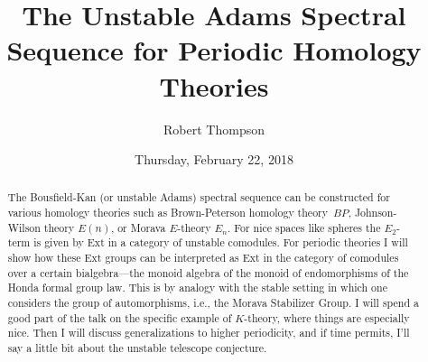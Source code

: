 \documentclass{UAmathtalk}
\author{Robert Thompson}
\title{The Unstable Adams Spectral Sequence for Periodic Homology Theories}
\date{Thursday, February 22, 2018}
\begin{document}
\maketitle

\begin{abstract}
The Bousfield-Kan (or unstable Adams) spectral sequence can be constructed for various homology theories such as Brown-Peterson homology theory~$\mathit{BP}$, Johnson-Wilson theory $E(n)$, or Morava $E$-theory $E_n$. For nice spaces like spheres the $E_2$-term is given by $\mathrm{Ext}$ in a category of unstable comodules. For periodic theories I will show how these $\mathrm{Ext}$ groups can be interpreted as $\mathrm{Ext}$ in the category of comodules over a certain bialgebra---the monoid algebra of the monoid of endomorphisms of the Honda formal group law. This is by analogy with the stable setting in which one considers the group of automorphisms, i.e., the Morava Stabilizer Group.  I will spend a good part of the talk on the specific example of $K$-theory, where things are especially nice. Then I will discuss generalizations to higher periodicity, and if time permits, I'll say a little bit about the unstable telescope conjecture.
\end{abstract}
\end{document}
